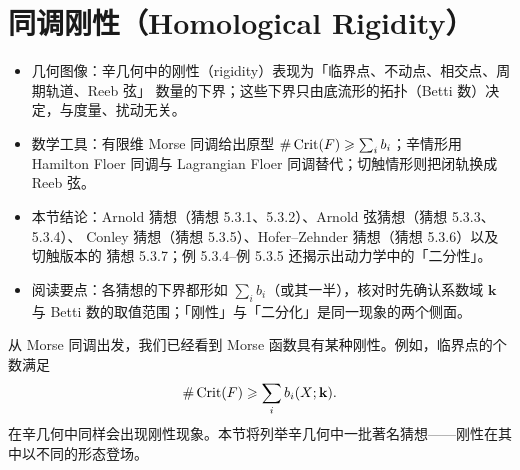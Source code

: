 
\section{同调刚性（Homological Rigidity）}

\begin{keytakeaways}
\begin{itemize}
  \item 几何图像：辛几何中的刚性（rigidity）表现为「临界点、不动点、相交点、周期轨道、Reeb 弦」
        数量的下界；这些下界只由底流形的拓扑（Betti 数）决定，与度量、扰动无关。
  \item 数学工具：有限维 Morse 同调给出原型 $\#\operatorname{Crit}(F)\geqslant\sum_i b_i$；辛情形用
        Hamilton Floer 同调与 Lagrangian Floer 同调替代；切触情形则把闭轨换成 Reeb 弦。
  \item 本节结论：Arnold 猜想（猜想 5.3.1、5.3.2）、Arnold 弦猜想（猜想 5.3.3、5.3.4）、
        Conley 猜想（猜想 5.3.5）、Hofer--Zehnder 猜想（猜想 5.3.6）以及切触版本的
        猜想 5.3.7；例 5.3.4--例 5.3.5 还揭示出动力学中的「二分性」。
  \item 阅读要点：各猜想的下界都形如 $\sum_i b_i$（或其一半），核对时先确认系数域 $\mathbf{k}$
        与 Betti 数的取值范围；「刚性」与「二分化」是同一现象的两个侧面。
\end{itemize}
\end{keytakeaways}

从 Morse 同调出发，我们已经看到 Morse 函数具有某种刚性。例如，临界点的个数满足
\[
  \#\operatorname{Crit}(F)\geqslant\sum_i b_i(X;\mathbf{k}).
\]
在辛几何中同样会出现刚性现象。本节将列举辛几何中一批著名猜想——刚性在其中以不同的形态登场。

